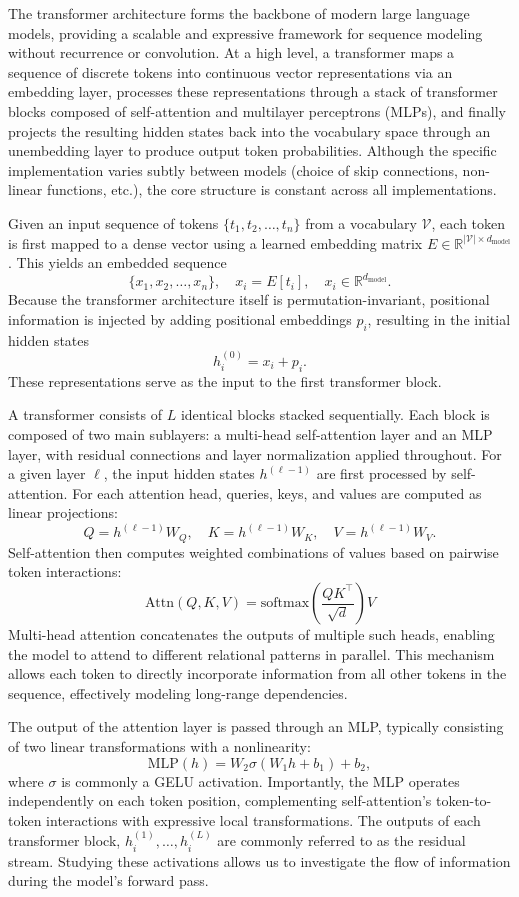 \documentclass[11pt]{article}
\begin{document}
The transformer architecture forms the backbone of modern large language models, providing a scalable and expressive framework for sequence modeling without recurrence or convolution. At a high level, a transformer maps a sequence of discrete tokens into continuous vector representations via an embedding layer, processes these representations through a stack of transformer blocks composed of self-attention and multilayer perceptrons (MLPs), and finally projects the resulting hidden states back into the vocabulary space through an unembedding layer to produce output token probabilities. Although the specific implementation varies subtly between models (choice of skip connections, non-linear functions, etc.), the core structure is constant across all implementations. 

Given an input sequence of tokens $\{t_1, t_2, \dots, t_n\}$ from a vocabulary $\mathcal{V}$, each token is first mapped to a dense vector using a learned embedding matrix $E \in \mathbb{R}^{|\mathcal{V}| \times d_{\text{model}}}$. This yields an embedded sequence 
\[
\{x_1, x_2, \dots, x_n\}, \quad x_i = E[t_i], \quad x_i \in \mathbb{R}^{d_{\text{model}}}.\]
Because the transformer architecture itself is permutation-invariant, positional information is injected by adding positional embeddings $p_i$, resulting in the initial hidden states
\[
h_i^{(0)} = x_i + p_i.
\]
These representations serve as the input to the first transformer block.

A transformer consists of $L$ identical blocks stacked sequentially. Each block is composed of two main sublayers: a multi-head self-attention layer and an MLP layer, with residual connections and layer normalization applied throughout. For a given layer $\ell$, the input hidden states $h^{(\ell-1)}$ are first processed by self-attention. For each attention head, queries, keys, and values are computed as linear projections:
\[
Q = h^{(\ell-1)} W_Q, \quad K = h^{(\ell-1)} W_K, \quad V = h^{(\ell-1)} W_V.
\]
Self-attention then computes weighted combinations of values based on pairwise token interactions:
\[
\text{Attn}(Q, K, V) = \text{softmax}\!\left(\frac{QK^\top}{\sqrt{d}}\right)V
\]
Multi-head attention concatenates the outputs of multiple such heads, enabling the model to attend to different relational patterns in parallel. This mechanism allows each token to directly incorporate information from all other tokens in the sequence, effectively modeling long-range dependencies.

The output of the attention layer is passed through an MLP, typically consisting of two linear transformations with a nonlinearity:
\[
\text{MLP}(h) = W_2 \sigma(W_1 h + b_1) + b_2,
\]
where $\sigma$ is commonly a GELU activation. Importantly, the MLP operates independently on each token position, complementing self-attention’s token-to-token interactions with expressive local transformations. The outputs of each transformer block, ${h_i^{(1)}, \dots, h_i^{(L)}}$ are commonly referred to as the residual stream. Studying these activations allows us to investigate the flow of information during the model's forward pass. 
\end{document}
